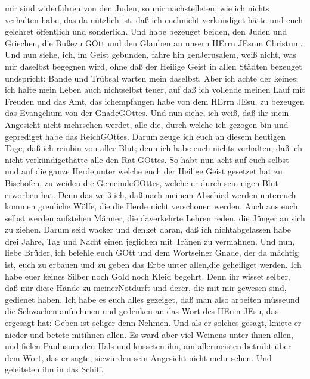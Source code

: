 mir sind widerfahren von den Juden, so mir nachstelleten; 
wie ich nichts verhalten habe, das da nützlich ist, daß ich euchnicht
verkündiget hätte und euch gelehret öffentlich und sonderlich.
 Und habe bezeuget beiden, den Juden und Griechen, die
Bußezu GOtt und den Glauben an unsern HErrn JEsum Christum.
 Und nun siehe, ich, im Geist gebunden, fahre hin
genJerusalem, weiß nicht, was mir daselbst begegnen wird, 
ohne daß der Heilige Geist in allen Städten bezeuget undspricht: Bande
und Trübsal warten mein daselbst.  Aber ich achte der
keines; ich halte mein Leben auch nichtselbst teuer, auf daß ich
vollende meinen Lauf mit Freuden und das Amt, das ichempfangen habe von
dem HErrn JEsu, zu bezeugen das Evangelium von der GnadeGOttes.
 Und nun siehe, ich weiß, daß ihr mein Angesicht nicht
mehrsehen werdet, alle die, durch welche ich gezogen bin und geprediget
habe das ReichGOttes.  Darum zeuge ich euch an diesem
heutigen Tage, daß ich reinbin von aller Blut;  denn ich
habe euch nichts verhalten, daß ich nicht verkündigethätte alle den Rat
GOttes.  So habt nun acht auf euch selbst und auf die ganze
Herde,unter welche euch der Heilige Geist gesetzet hat zu Bischöfen, zu
weiden die GemeindeGOttes, welche er durch sein eigen Blut erworben hat.
 Denn das weiß ich, daß nach meinem Abschied werden
untereuch kommen greuliche Wölfe, die die Herde nicht verschonen werden.
 Auch aus euch selbst werden aufstehen Männer, die
daverkehrte Lehren reden, die Jünger an sich zu ziehen. 
Darum seid wacker und denket daran, daß ich nichtabgelassen habe drei
Jahre, Tag und Nacht einen jeglichen mit Tränen zu vermahnen.
 Und nun, liebe Brüder, ich befehle euch GOtt und dem
Wortseiner Gnade, der da mächtig ist, euch zu erbauen und zu geben das
Erbe unter allen,die geheiliget werden.  Ich habe euer
keines Silber noch Gold noch Kleid begehrt.  Denn ihr
wisset selber, daß mir diese Hände zu meinerNotdurft und derer, die mit
mir gewesen sind, gedienet haben.  Ich habe es euch alles
gezeiget, daß man also arbeiten müsseund die Schwachen aufnehmen und
gedenken an das Wort des HErrn JEsu, das ergesagt hat: Geben ist seliger
denn Nehmen.  Und als er solches gesagt, kniete er nieder
und betete mitihnen allen.  Es ward aber viel Weinens unter
ihnen allen, und fielen Paulusum den Hals und küsseten ihn,
 am allermeisten betrübt über dem Wort, das er sagte,
siewürden sein Angesicht nicht mehr sehen. Und geleiteten ihn in das
Schiff.

